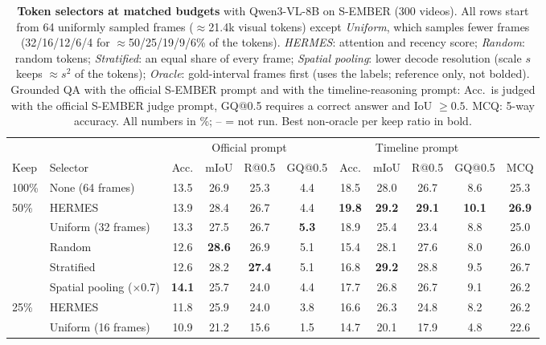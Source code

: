 \begin{table}[t]
\centering
\setlength{\tabcolsep}{4.5pt}
\caption{\textbf{Token selectors at matched budgets} with Qwen3-VL-8B on S-EMBER (300 videos). All rows start from 64 uniformly sampled frames ($\approx$21.4k visual tokens) except \emph{Uniform}, which samples fewer frames (32/16/12/6/4 for $\approx$50/25/19/9/6\% of the tokens). \emph{HERMES}: attention and recency score; \emph{Random}: random tokens; \emph{Stratified}: an equal share of every frame; \emph{Spatial pooling}: lower decode resolution (scale $s$ keeps $\approx s^2$ of the tokens); \emph{Oracle}: gold-interval frames first (uses the labels; reference only, not bolded). Grounded QA with the official S-EMBER prompt and with the timeline-reasoning prompt: Acc.\ is judged with the official S-EMBER judge prompt, GQ@0.5 requires a correct answer and IoU $\geq 0.5$. MCQ: 5-way accuracy. All numbers in \%; -- = not run. Best non-oracle per keep ratio in bold.}
\label{tab:selectors}
\begin{tabular}{llccccccccc}
\toprule
& & \multicolumn{4}{c}{Official prompt} & \multicolumn{4}{c}{Timeline prompt} & \\
\cmidrule(lr){3-6} \cmidrule(lr){7-10}
Keep & Selector & Acc. & mIoU & R@0.5 & GQ@0.5 & Acc. & mIoU & R@0.5 & GQ@0.5 & MCQ \\
\midrule
100\% & None (64 frames) & 13.5 & 26.9 & 25.3 & 4.4 & 18.5 & 28.0 & 26.7 & 8.6 & 25.3 \\
\midrule
\multirow{5}{*}{50\%} & HERMES & 13.9 & 28.4 & 26.7 & 4.4 & \textbf{19.8} & \textbf{29.2} & \textbf{29.1} & \textbf{10.1} & \textbf{26.9} \\
 & Uniform (32 frames) & 13.3 & 27.5 & 26.7 & \textbf{5.3} & 18.9 & 25.4 & 23.4 & 8.8 & 25.0 \\
 & Random & 12.6 & \textbf{28.6} & 26.9 & 5.1 & 15.4 & 28.1 & 27.6 & 8.0 & 26.0 \\
 & Stratified & 12.6 & 28.2 & \textbf{27.4} & 5.1 & 16.8 & \textbf{29.2} & 28.8 & 9.5 & 26.7 \\
 & Spatial pooling ($\times$0.7) & \textbf{14.1} & 25.7 & 24.0 & 4.4 & 17.7 & 26.8 & 26.7 & 9.1 & 26.2 \\
\midrule
\multirow{5}{*}{25\%} & HERMES & 11.8 & 25.9 & 24.0 & 3.8 & 16.6 & 26.3 & 24.8 & 8.2 & 26.2 \\
 & Uniform (16 frames) & 10.9 & 21.2 & 15.6 & 1.5 & 14.7 & 20.1 & 17.9 & 4.8 & 22.6 \\

\end{tabular}
\end{table}
